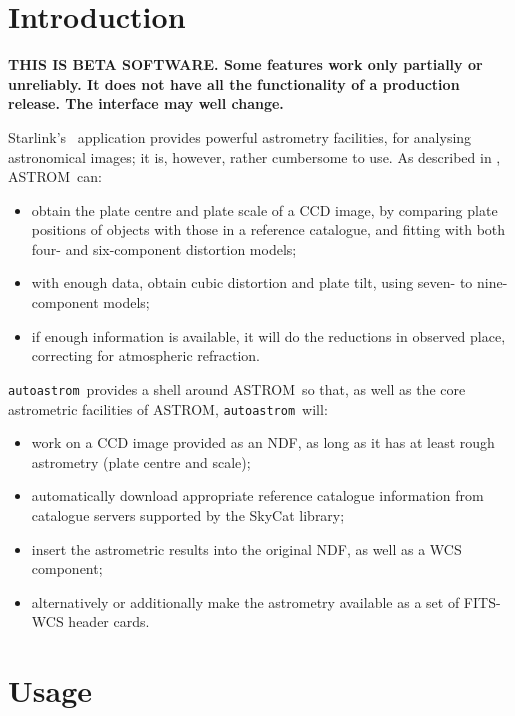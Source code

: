 \documentclass[twoside,11pt,nolof]{starlink}
\providecommand{\ASTROM}{{\footnotesize ASTROM}\normalsize}
\providecommand{\ASTROMref}{\xref{{\footnotesize ASTROM}}{sun5}{}}
\providecommand{\autoastrom}{\texttt{autoastrom}}
\begin{document}
\scfrontmatter

\section{Introduction\label{se:intro}}

\textbf{THIS IS BETA SOFTWARE. Some features work only partially or
  unreliably. It does not have all the functionality of a production
  release. The interface may well change.}

Starlink's \ASTROMref\ application provides powerful astrometry facilities, for
analysing astronomical images; it is, however, rather cumbersome to use. As
described in , \ASTROM\ can:

\begin{itemize}
\item obtain the plate centre and plate scale of a CCD image, by comparing
  plate positions of objects with those in a reference catalogue, and fitting
  with both four- and six-component distortion models;
\item with enough data, obtain cubic distortion and plate tilt, using seven-
  to nine-component models;
\item if enough information is available, it will do the reductions in
  observed place, correcting for atmospheric refraction.
\end{itemize}

\autoastrom\ provides a shell around \ASTROM\ so that, as well
as the core astrometric facilities of \ASTROM, \autoastrom\
will:

\begin{itemize}

\item work on a CCD image provided as an NDF, as long as it has at
least rough astrometry (plate centre and scale);

\item automatically download appropriate reference catalogue information
from catalogue servers supported by the SkyCat library;

\item insert the astrometric results into the original NDF, as well as
a WCS component; \item alternatively or additionally make the
astrometry available as a set of FITS-WCS header cards.  \end{itemize}

\section{Usage\label{se:usage}}
\end{document}
